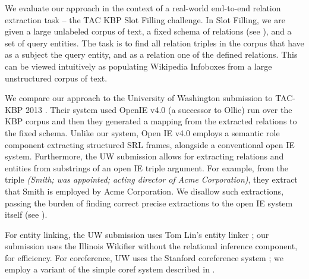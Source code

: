 We evaluate our approach in the context of a real-world end-to-end 
  relation extraction task -- the TAC KBP Slot Filling challenge.
In Slot Filling, we are given a large unlabeled corpus of text, a fixed
  schema of relations (see ), and a set of
  query entities.
The task is to find all relation triples in the corpus that have as a subject
  the query entity, and as a relation one of the defined relations.
This can be viewed intuitively as populating Wikipedia Infoboxes from a large
  unstructured corpus of text.

We compare our approach to the University of Washington submission to
  TAC-KBP 2013 \cite{key:2013soderland-kbp}.
Their system used OpenIE v4.0 (a successor to Ollie) 
  run over the KBP corpus and then they generated a mapping from the 
  extracted relations to the fixed schema.
Unlike our system, Open IE v4.0 employs a semantic role
  component extracting structured SRL frames, alongside a conventional
  open IE system.
Furthermore, the UW submission allows for extracting relations and entities
  from substrings of an open IE triple argument.
For example, from the triple \textit{(Smith; was appointed; acting director of Acme
  Corporation)}, they extract that Smith is employed by Acme Corporation.
We disallow such extractions, passing the burden of finding correct
  precise extractions to the open IE system itself (see ).

For entity linking, the UW submission uses Tom Lin's entity linker
  \cite{key:2012lin-el}; our submission uses the Illinois Wikifier 
  \cite{key:2011ratinov-el} without the relational inference component, for
  efficiency.
For coreference, UW uses the Stanford coreference system
  \cite{key:stanford-coref}; we employ a variant of the simple coref system
  described in \cite{key:2014pink-kbp}.

